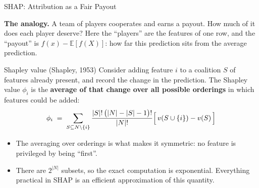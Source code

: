 \begin{frame}{SHAP: Attribution as a Fair Payout}

    \textbf{The analogy.} A team of players cooperates and earns a payout. How much of it does each
    player deserve? Here the ``players'' are the features of one row, and the ``payout'' is
    $f(x) - \mathbb{E}[f(X)]$: how far this prediction sits from the average prediction.

    \vspace{0.8em}

    \begin{block}{Shapley value (Shapley, 1953)}
        Consider adding feature $i$ to a coalition $S$ of features already present, and record the
        change in the prediction. The Shapley value $\phi_i$ is the \textbf{average of that change
        over all possible orderings} in which features could be added:
        \[
            \phi_i \;=\; \sum_{S \subseteq N \setminus \{i\}}
            \frac{|S|!\,\bigl(|N|-|S|-1\bigr)!}{|N|!}
            \Bigl[\, v(S \cup \{i\}) - v(S) \,\Bigr]
        \]
    \end{block}

    \vspace{0.5em}

    \begin{itemize}\small
        \setlength\itemsep{0.3em}
        \item The averaging over orderings is what makes it symmetric: no feature is privileged by
              being ``first''.
        \item There are $2^{|N|}$ subsets, so the exact computation is exponential.
              Everything practical in SHAP is an efficient approximation of this quantity.
    \end{itemize}
\end{frame}


